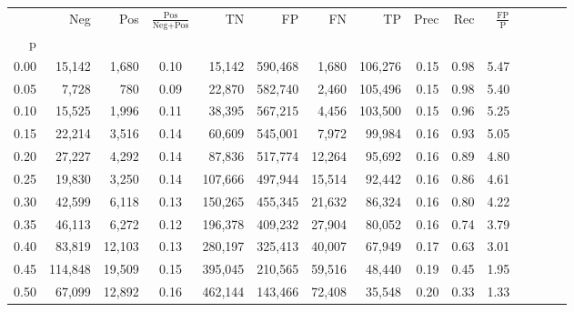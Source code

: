 \begin{tabular}{rrrcrrrrrrrrrrr}
\toprule
{} &      Neg &     Pos & $\frac{\text{Pos}}{\text{Neg}+\text{Pos}}$ &       TN &       FP &       FN &       TP &  Prec &   Rec & $\frac{\text{FP}}{\text{P}}$ \\
p    &          &         &                                            &          &          &          &          &       &       &                              \\
\midrule
0.00 &   15,142 &   1,680 &                                       0.10 &   15,142 &  590,468 &    1,680 &  106,276 &  0.15 &  0.98 &                         5.47 \\
0.05 &    7,728 &     780 &                                       0.09 &   22,870 &  582,740 &    2,460 &  105,496 &  0.15 &  0.98 &                         5.40 \\
0.10 &   15,525 &   1,996 &                                       0.11 &   38,395 &  567,215 &    4,456 &  103,500 &  0.15 &  0.96 &                         5.25 \\
0.15 &   22,214 &   3,516 &                                       0.14 &   60,609 &  545,001 &    7,972 &   99,984 &  0.16 &  0.93 &                         5.05 \\
0.20 &   27,227 &   4,292 &                                       0.14 &   87,836 &  517,774 &   12,264 &   95,692 &  0.16 &  0.89 &                         4.80 \\
0.25 &   19,830 &   3,250 &                                       0.14 &  107,666 &  497,944 &   15,514 &   92,442 &  0.16 &  0.86 &                         4.61 \\
0.30 &   42,599 &   6,118 &                                       0.13 &  150,265 &  455,345 &   21,632 &   86,324 &  0.16 &  0.80 &                         4.22 \\
0.35 &   46,113 &   6,272 &                                       0.12 &  196,378 &  409,232 &   27,904 &   80,052 &  0.16 &  0.74 &                         3.79 \\
0.40 &   83,819 &  12,103 &                                       0.13 &  280,197 &  325,413 &   40,007 &   67,949 &  0.17 &  0.63 &                         3.01 \\
0.45 &  114,848 &  19,509 &                                       0.15 &  395,045 &  210,565 &   59,516 &   48,440 &  0.19 &  0.45 &                         1.95 \\
0.50 &   67,099 &  12,892 &                                       0.16 &  462,144 &  143,466 &   72,408 &   35,548 &  0.20 &  0.33 &                         1.33 \\

\end{tabular}
